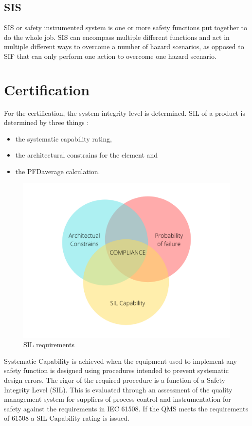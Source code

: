 \subsection{SIS}
\label{sec:sis}

SIS or safety instrumented system is one or more safety functions put together to do the whole job. SIS can encompass multiple different functions and act in multiple different ways to overcome a number of hazard scenarios, as opposed to SIF that can only perform one action to overcome one hazard scenario.

\section{Certification}


For the certification, the system integrity level is determined. SIL of a product is determined by three things \citep{func_safety_fundamentals}:
\begin{itemize}

    \item the systematic capability rating,
    \item the architectural constrains for the element and
    \item the PFDaverage calculation.
    
\end{itemize}

\begin{figure}[H]

      \centering
      \includegraphics[width=0.7\linewidth]{images/sil_requirements.png}
      \caption{SIL requirements}
      \label{fig:sil_requirements}
    
\end{figure}

Systematic Capability is achieved when the equipment used to implement any safety function is designed using procedures intended to prevent systematic design errors.  The rigor of the required procedure is a function of a Safety Integrity Level (SIL). This is evaluated through an assessment of the quality management system for suppliers of process control and instrumentation for safety against the requirements in IEC 61508.  If the QMS meets the requirements of 61508 a SIL Capability rating is issued. 

